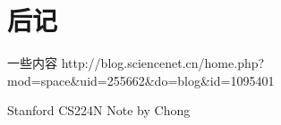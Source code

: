 \chapter{后记}

一些内容
http://blog.sciencenet.cn/home.php?mod=space\&uid=255662\&do=blog\&id=1095401

\begin{flushright}

Stanford CS224N Note by Chong

 

\end{flushright}